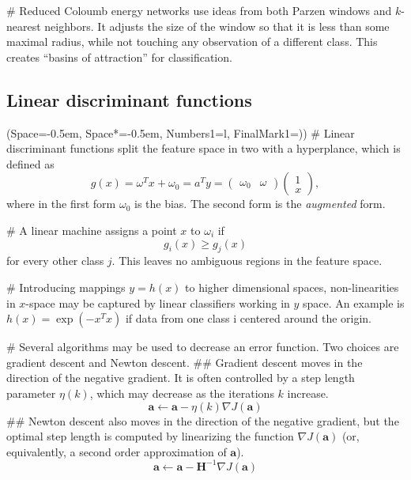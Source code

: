 \documentclass[12pt, a4paper]{article}
\newcommand{\listSpace}{-0.5em}%
\newcommand{\vect}[1]{\bm{#1}}
\begin{document}
\begin{easylist}[itemize]
# Reduced Coloumb energy networks use ideas from both Parzen windows and $k$-nearest neighbors.
It adjusts the size of the window so that it is less than some maximal radius, while not touching any observation of a different class.
This creates ``basins of attraction'' for classification.
\end{easylist}


\subsection{Linear discriminant functions}
\begin{easylist}[itemize]
\ListProperties(Space=\listSpace, Space*=\listSpace, Numbers1=l, FinalMark1={)})
# Linear discriminant functions split the feature space in two with a hyperplance, which is defined as
\begin{equation*}
	g(x) = \omega^T x + \omega_0 = a^T y =
	\begin{pmatrix}
	\omega_0 & \omega
	\end{pmatrix}
	\begin{pmatrix}
	1 \\
	x
	\end{pmatrix},
\end{equation*}
where in the first form $\omega_0$ is the bias. The second form is the \emph{augmented} form.

# A linear machine assigns a point $x$ to $\omega_i$ if
\begin{equation*}
	g_i( x ) \geq g_j( x )
\end{equation*}
for every other class $j$.
This leaves no ambiguous regions in the feature space.

# Introducing mappings $y = h(x)$ to higher dimensional spaces, non-linearities in $x$-space may be captured by linear classifiers working in $y$ space. An example is $h(x) = \exp(-x^T x)$ if data from one class i centered around the origin.

# Several algorithms may be used to decrease an error function.
Two choices are gradient descent and Newton descent.
## Gradient descent moves in the direction of the negative gradient.
It is often controlled by a step length parameter $\eta(k)$, which may decrease as the iterations $k$ increase.
\begin{equation*}
	\vect{a} \leftarrow \vect{a} - \eta(k) \nabla J(\vect{a})
\end{equation*}
## Newton descent also moves in the direction of the negative gradient, but the optimal step length is computed by linearizing the function $\nabla J(\vect{a})$ (or, equivalently, a second order approximation of $\vect{a}$).
\begin{equation*}
\vect{a} \leftarrow \vect{a} - \vect{H}^{-1} \nabla J(\vect{a})
\end{equation*}


\end{easylist}
\end{document}
